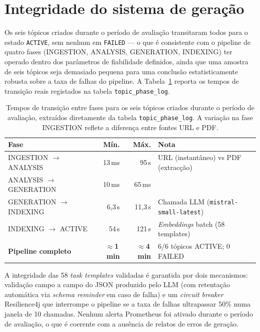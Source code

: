 \section{Integridade do sistema de geração}
\label{sec:integridade-geracao}

Os seis tópicos criados durante o período de avaliação transitaram todos para o estado \texttt{ACTIVE}, sem nenhum em \texttt{FAILED} --- o que é consistente com o pipeline de quatro fases (INGESTION, ANALYSIS, GENERATION, INDEXING) ter operado dentro dos parâmetros de fiabilidade definidos, ainda que uma amostra de seis tópicos seja demasiado pequena para uma conclusão estatisticamente robusta sobre a taxa de falhas do pipeline. A Tabela~\ref{tab:timing-geracao} reporta os tempos de transição reais registados na tabela \texttt{topic\_phase\_log}.

\begin{table}[htbp]
	\centering
	\small
	\begin{tabular}{l r r p{5cm}}
		\toprule
		\textbf{Fase} & \textbf{Mín.} & \textbf{Máx.} & \textbf{Nota} \\
		\midrule
		INGESTION $\to$ ANALYSIS   & 13\,ms           & 95\,s    & URL (instantâneo) vs PDF (extracção) \\
		ANALYSIS $\to$ GENERATION  & 10\,ms           & 65\,ms   & \\
		GENERATION $\to$ INDEXING  & 6,3\,s           & 11,3\,s  & Chamada LLM (\texttt{mistral-small-latest}) \\
		INDEXING $\to$ ACTIVE      & 54\,s            & 121\,s   & \emph{Embeddings} batch (58 templates) \\
		\midrule
		\textbf{Pipeline completo} & \textbf{$\approx$1\,min} & \textbf{$\approx$4\,min} & 6/6 tópicos ACTIVE; 0 FAILED \\
		\bottomrule
	\end{tabular}
	\caption[Tempos reais de transição do pipeline de geração (fonte: \texttt{topic\_phase\_log})]{Tempos de transição entre fases para os seis tópicos criados durante o período de avaliação, extraídos diretamente da tabela \texttt{topic\_phase\_log}. A variação na fase INGESTION reflete a diferença entre fontes URL e PDF.}
	\label{tab:timing-geracao}
\end{table}

A integridade das 58 \emph{task templates} validadas é garantida por dois mecanismos: validação campo a campo do JSON produzido pelo LLM (com retentação automática via \emph{schema reminder} em caso de falha) e um \emph{circuit breaker} Resilience4j que interrompe o pipeline se a taxa de falhas ultrapassar 50\% numa janela de 10 chamadas. Nenhum alerta Prometheus foi ativado durante o período de avaliação, o que é coerente com a ausência de relatos de erros de geração.

